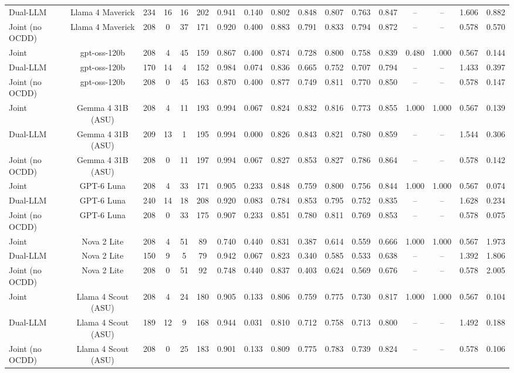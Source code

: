 \begin{table}[htbp]
\begin{tabular}{lcccccccccccccccc}
Dual-LLM & Llama 4 Maverick & 234 & 16 & 16 & 202 & 0.941 & 0.140 & 0.802 & 0.848 & 0.807 & 0.763 & 0.847 & -- & -- & 1.606 & 0.882 \\
Joint (no OCDD) & Llama 4 Maverick & 208 & 0 & 37 & 171 & 0.920 & 0.400 & 0.883 & 0.791 & 0.833 & 0.794 & 0.872 & -- & -- & 0.578 & 0.570 \\
Joint & gpt-oss-120b & 208 & 4 & 45 & 159 & 0.867 & 0.400 & 0.874 & 0.728 & 0.800 & 0.758 & 0.839 & 0.480 & 1.000 & 0.567 & 0.144 \\
Dual-LLM & gpt-oss-120b & 170 & 14 & 4 & 152 & 0.984 & 0.074 & 0.836 & 0.665 & 0.752 & 0.707 & 0.794 & -- & -- & 1.433 & 0.397 \\
Joint (no OCDD) & gpt-oss-120b & 208 & 0 & 45 & 163 & 0.870 & 0.400 & 0.877 & 0.749 & 0.811 & 0.770 & 0.850 & -- & -- & 0.578 & 0.147 \\
Joint & Gemma 4 31B (ASU) & 208 & 4 & 11 & 193 & 0.994 & 0.067 & 0.824 & 0.832 & 0.816 & 0.773 & 0.855 & 1.000 & 1.000 & 0.567 & 0.139 \\
Dual-LLM & Gemma 4 31B (ASU) & 209 & 13 & 1 & 195 & 0.994 & 0.000 & 0.826 & 0.843 & 0.821 & 0.780 & 0.859 & -- & -- & 1.544 & 0.306 \\
Joint (no OCDD) & Gemma 4 31B (ASU) & 208 & 0 & 11 & 197 & 0.994 & 0.067 & 0.827 & 0.853 & 0.827 & 0.786 & 0.864 & -- & -- & 0.578 & 0.142 \\
Joint & GPT-6 Luna & 208 & 4 & 33 & 171 & 0.905 & 0.233 & 0.848 & 0.759 & 0.800 & 0.756 & 0.844 & 1.000 & 1.000 & 0.567 & 0.074 \\
Dual-LLM & GPT-6 Luna & 240 & 14 & 18 & 208 & 0.920 & 0.083 & 0.784 & 0.853 & 0.795 & 0.752 & 0.835 & -- & -- & 1.628 & 0.234 \\
Joint (no OCDD) & GPT-6 Luna & 208 & 0 & 33 & 175 & 0.907 & 0.233 & 0.851 & 0.780 & 0.811 & 0.769 & 0.853 & -- & -- & 0.578 & 0.075 \\
Joint & Nova 2 Lite & 208 & 4 & 51 & 89 & 0.740 & 0.440 & 0.831 & 0.387 & 0.614 & 0.559 & 0.666 & 1.000 & 1.000 & 0.567 & 1.973 \\
Dual-LLM & Nova 2 Lite & 150 & 9 & 5 & 79 & 0.942 & 0.067 & 0.823 & 0.340 & 0.585 & 0.533 & 0.638 & -- & -- & 1.392 & 1.806 \\
Joint (no OCDD) & Nova 2 Lite & 208 & 0 & 51 & 92 & 0.748 & 0.440 & 0.837 & 0.403 & 0.624 & 0.569 & 0.676 & -- & -- & 0.578 & 2.005 \\
Joint & Llama 4 Scout (ASU) & 208 & 4 & 24 & 180 & 0.905 & 0.133 & 0.806 & 0.759 & 0.775 & 0.730 & 0.817 & 1.000 & 1.000 & 0.567 & 0.104 \\
Dual-LLM & Llama 4 Scout (ASU) & 189 & 12 & 9 & 168 & 0.944 & 0.031 & 0.810 & 0.712 & 0.758 & 0.713 & 0.800 & -- & -- & 1.492 & 0.188 \\
Joint (no OCDD) & Llama 4 Scout (ASU) & 208 & 0 & 25 & 183 & 0.901 & 0.133 & 0.809 & 0.775 & 0.783 & 0.739 & 0.824 & -- & -- & 0.578 & 0.106 \\
\bottomrule
\end{tabular}
\end{table}